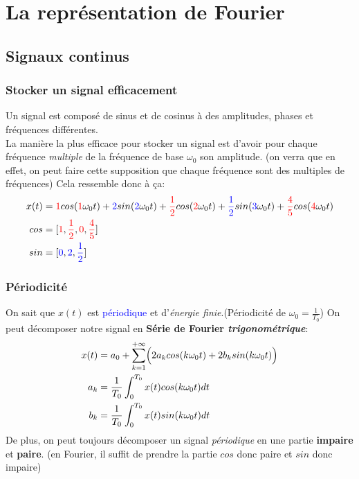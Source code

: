 \documentclass{report}
\begin{document}
\section{La représentation de Fourier}

\subsection{Signaux continus}
\subsubsection{Stocker un signal efficacement}
Un signal est composé de sinus et de cosinus à des amplitudes, phases et fréquences différentes.\\
La manière la plus efficace pour stocker un signal est d'avoir pour chaque fréquence \textit{multiple} de la fréquence de base $\omega_0$ son amplitude. (on verra que en effet, on peut faire cette supposition que chaque fréquence sont des multiples de fréquences) Cela ressemble donc à ça:
\begin{align}
x(t) &= \textcolor{red}{1}cos(\textcolor{red}{1}\omega_0t) + \textcolor{blue}{2}sin(\textcolor{blue}{2}\omega_0t) + \textcolor{red}{\frac{1}{2}}cos(\textcolor{red}{2}\omega_0t) + \textcolor{blue}{\frac{1}{2}}sin(\textcolor{blue}{3}\omega_0t) +  \textcolor{red}{\frac{4}{5}}cos(\textcolor{red}{4}\omega_0t) \label{eq:signal}\\
cos &= [\textcolor{red}{1}, \textcolor{red}{\frac{1}{2}}, \textcolor{red}{0}, \textcolor{red}{\frac{4}{5}}]\\
sin &= [\textcolor{blue}{0}, \textcolor{blue}{2}, \textcolor{blue}{\frac{1}{2}}]
\end{align}
\subsubsection{Périodicité}
On sait que $x(t)$ est \textcolor{blue}{périodique} et d'\textit{énergie finie}.(Périodicité de $\omega_0 = \frac{1}{T_0}$) On peut décomposer notre signal en \textbf{Série de Fourier \textit{trigonométrique}}:
\begin{align}
x(t) &= a_0 + \sum_{k=1}^{+\infty} \Bigl(2 a_k cos(k\omega_0 t) + 2b_k sin(k \omega_0 t) \Bigl)\\
a_k &= \frac{1}{T_0} \int_0^{T_0} x(t) cos(k\omega_0t)dt\\
b_k &= \frac{1}{T_0} \int_0^{T_0} x(t) sin(k\omega_0t)dt
\end{align}
De plus, on peut toujours décomposer un signal \textit{périodique} en une partie \textbf{impaire} et \textbf{paire}. (en Fourier, il suffit de prendre la partie $cos$ donc paire et $sin$ donc impaire)\\
\end{document}
